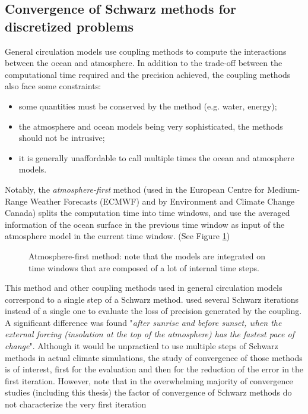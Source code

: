 \subsection{Convergence of Schwarz methods for discretized problems}
General circulation models
use coupling methods to compute the interactions
between the ocean and atmosphere.
In addition to the trade-off between the computational time required and
the precision achieved, the coupling methods
also face some constraints:
\begin{itemize}
	\item some quantities must be conserved by the method
		(e.g. water, energy);
	\item the atmosphere and ocean models being very
		sophisticated, the methods should not be intrusive;
	\item it is generally unaffordable to call multiple times
		the ocean and atmosphere models.
\end{itemize}
Notably, the \textit{atmosphere-first} method
(used in the European Centre for Medium-Range Weather Forecasts
(ECMWF) and by Environment and Climate Change Canada)
splits the computation time into time windows, and use the
averaged information of the ocean surface in the previous
time window as input of the atmosphere model in the current
time window. (See Figure \ref{fig:airseaSCM_atmFirst})
\begin{figure}
\centering
\caption{Atmosphere-first method: note that the models are
	integrated on time windows that are composed of a lot
	of internal time steps.}
\label{fig:airseaSCM_atmFirst}
\end{figure}
This method and other coupling methods used in
general circulation models correspond to a single step
of a Schwarz method.
\citep{marti_schwarz_2021} used several Schwarz iterations
instead of a single one to evaluate the loss of precision
generated by the coupling. A significant difference was found
"\textit{after sunrise
and before sunset, when the external forcing (insolation at
the top of the atmosphere) has the fastest pace of change}".
Although it would be unpractical to use multiple
steps of Schwarz methods in actual climate simulations,
the study of convergence of those methods is of interest,
first for the evaluation and then for the reduction of the
error in the first iteration. However, note that
in the overwhelming majority of convergence studies
(including this thesis) the factor of convergence of
Schwarz methods do not characterize the very first iteration
